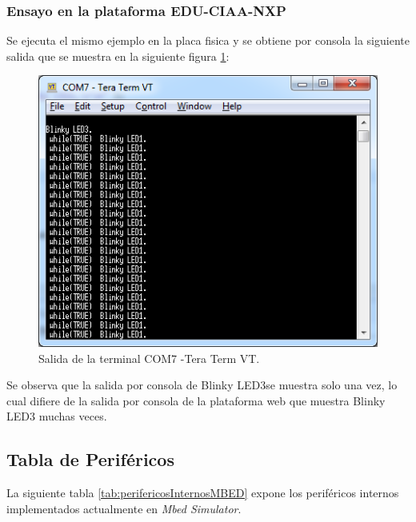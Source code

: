 \subsubsection{Ensayo en la plataforma EDU-CIAA-NXP} 

Se ejecuta el mismo ejemplo en la placa fisica y se obtiene por consola la siguiente salida que se muestra en la siguiente figura \ref{fig:TesttickhookPlaca}:


\begin{figure}[ht]
	\centering
	\includegraphics[scale=.80]{./Figures/TesttickhookPlaca.png}
	\caption{Salida de la terminal COM7 -Tera Term VT.}
	\label{fig:TesttickhookPlaca}
\end{figure}

\hfill \break
\hfill \break
\hfill \break
\hfill \break
\hfill \break
\hfill \break
\hfill \break
\hfill \break
\hfill \break
\hfill \break
\hfill \break
\hfill \break
\hfill \break
Se observa que la salida por consola de \textquotedbl Blinky LED3\textquotedbl se muestra solo una vez, lo cual difiere de la salida por consola de la plataforma web que muestra \textquotedbl Blinky LED3\textquotedbl{} muchas veces.


\subsection{Tabla de Periféricos}

La siguiente tabla \ref{tab:perifericosInternosMBED} expone los  periféricos internos implementados actualmente en \textit{Mbed Simulator}.

